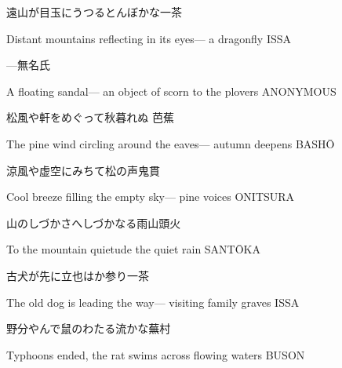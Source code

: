 \begin{haiku}
    {\FH 遠山が目玉にうつるとんぼかな}\hfill{\FH 一茶}

    \vin{} Distant mountains
    \vin{} \vin{} reflecting in its eyes---
    \vin{} \vin{} \vin{} a dragonfly \hspace{\fill} ISSA
\end{haiku}

\begin{haiku}
    {---}\hfill{\FH 無名氏}

    \vin{} A floating sandal---
    \vin{} \vin{} an object of scorn
    \vin{} \vin{} \vin{} to the plovers \hspace{\fill} ANONYMOUS
\end{haiku}

\begin{haiku}
    {\FH 松風や軒をめぐって秋暮れぬ }\hfill{\FH 芭蕉}

    \vin{} The pine wind
    \vin{} \vin{} circling around the eaves---
    \vin{} \vin{} \vin{} autumn deepens \hspace{\fill} BASH\={O}
\end{haiku}

\begin{haiku}
    {\FH 涼風や虚空にみちて松の声}\hfill{\FH 鬼貫}

    \vin{} Cool breeze
    \vin{} \vin{} filling the empty sky---
    \vin{} \vin{} \vin{} pine voices \hspace{\fill} ONITSURA
\end{haiku}

\begin{haiku}
    {\FH 山のしづかさへしづかなる雨}\hfill{\FH 山頭火}

    \vin{} To the mountain quietude
    \vin{} \vin{} the quiet
    \vin{} \vin{} \vin{} rain \hspace{\fill} SANT\={O}KA
\end{haiku}

\begin{haiku}
    {\FH 古犬が先に立也はか参り}\hfill{\FH 一茶}

    \vin{} The old dog
    \vin{} \vin{} is leading the way---
    \vin{} \vin{} \vin{} visiting family graves \hspace{\fill} ISSA
\end{haiku}

\begin{haiku}
    {\FH 野分やんで鼠のわたる流かな}\hfill{\FH 蕪村}

    \vin{} Typhoons ended,
    \vin{} \vin{} the rat swims across
    \vin{} \vin{} \vin{} flowing waters \hspace{\fill} BUSON
\end{haiku}

